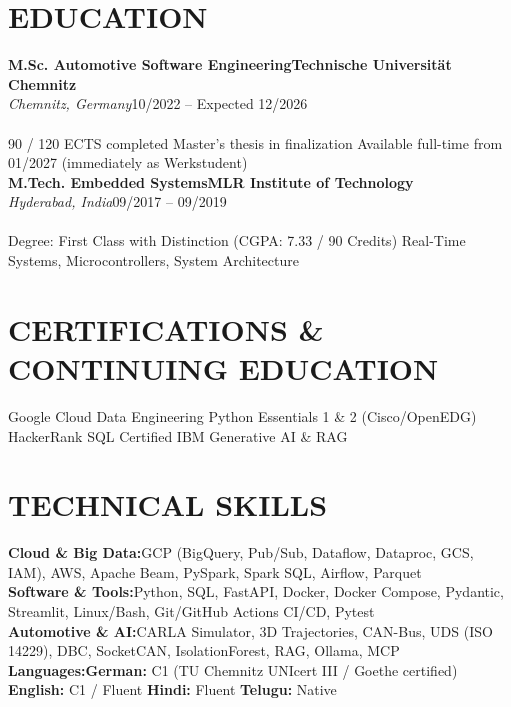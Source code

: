 \documentclass[9.6pt,a4paper]{article}
\newcommand{\educationitem}[4]{%
  \textbf{#1}\hfill\textbf{#2}\\[-0.02em]
  {\small\textit{#3}}\hfill{\small #4}\\[0.12em]
}
\newcommand{\skillrow}[2]{\textbf{#1:}\enspace #2\\[-0.02em]}
\begin{document}
\section{EDUCATION}

\educationitem{M.Sc. Automotive Software Engineering}{Technische Universität Chemnitz}{Chemnitz, Germany}{10/2022 -- Expected 12/2026}\\
{\small 90 / 120 ECTS completed \enspace\textbar\enspace Master's thesis in finalization \enspace\textbar\enspace Available full-time from 01/2027 (immediately as Werkstudent)}\\[0.02em]
\educationitem{M.Tech. Embedded Systems}{MLR Institute of Technology}{Hyderabad, India}{09/2017 -- 09/2019}\\
{\small Degree: First Class with Distinction (CGPA: 7.33 / 90 Credits) \enspace\textbar\enspace Real-Time Systems, Microcontrollers, System Architecture}

\section{CERTIFICATIONS \& CONTINUING EDUCATION}
{\small
\textbullet\enspace Google Cloud Data Engineering \enspace\textbullet\enspace Python Essentials 1 \& 2 (Cisco/OpenEDG) \enspace\textbullet\enspace HackerRank SQL Certified \enspace\textbullet\enspace IBM Generative AI \& RAG
}

\section{TECHNICAL SKILLS}
{\small
\skillrow{Cloud \& Big Data}{GCP (BigQuery, Pub/Sub, Dataflow, Dataproc, GCS, IAM), AWS, Apache Beam, PySpark, Spark SQL, Airflow, Parquet}
\skillrow{Software \& Tools}{Python, SQL, FastAPI, Docker, Docker Compose, Pydantic, Streamlit, Linux/Bash, Git/GitHub Actions CI/CD, Pytest}
\skillrow{Automotive \& AI}{CARLA Simulator, 3D Trajectories, CAN-Bus, UDS (ISO 14229), DBC, SocketCAN, IsolationForest, RAG, Ollama, MCP}
\skillrow{Languages}{\textbf{German:} C1 (TU Chemnitz UNIcert III / Goethe certified) \enspace\textbar\enspace \textbf{English:} C1 / Fluent \enspace\textbar\enspace \textbf{Hindi:} Fluent \enspace\textbar\enspace \textbf{Telugu:} Native}
}
\end{document}
